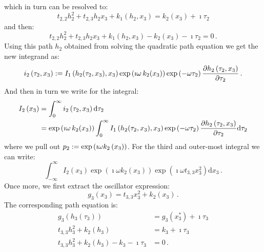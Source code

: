 \documentclass[a4paper,10pt]{article}
\begin{document}
which in turn can be resolved to:
\begin{equation}
  t_{2,2} h_2^2 + t_{2,3} h_2 x_3 + k_1(h_2, x_3) = k_2(x_3) + \imath \tau_2
\end{equation}
and then:
\begin{equation}
  t_{2,2} h_2^2 + t_{2,3} h_2 x_3 + k_1(h_2, x_3) - k_2(x_3) - \imath \tau_2 = 0 \,.
\end{equation}
Using this path $h_2$ obtained from solving the quadratic
path equation we get the new integrand as:
\begin{equation}
  i_2\left(\tau_2, x_3\right) := I_1\left(h_2(\tau_2, x_3), x_3\right)
                                 \exp\left(\imath \omega \,k_2\!\left(x_3\right) \right)
                                 \exp\left(- \omega \tau_2 \right)
                                 \frac{\partial h_2\left(\tau_2, x_3\right)}{\partial \tau_2} \,.
\end{equation}
And then in turn we write for the integral:
\begin{equation*}
\begin{split}
  I_2\left(x_3\right) & = \int_0^{\infty} i_2\left(\tau_2, x_3\right) \mathrm{d}\tau_2 \\
                      & = \exp\left(\imath \omega \,k_2\!\left(x_3\right) \right)
                          \int_0^{\infty} I_1\left(h_2(\tau_2, x_3), x_3\right)
                                          \exp\left(- \omega \tau_2 \right)
                                          \frac{\partial h_2\left(\tau_2, x_3\right)}{\partial \tau_2}
                          \mathrm{d}\tau_2
\end{split}
\end{equation*}
where we pull out $p_2 := \exp\left(\imath \omega k_2\left(x_3\right) \right)$.
For the third and outer-most integral we can write:
\begin{equation}
  \int_{-\infty}^{\infty} I_2\left(x_3\right)
                          \exp\left(\imath \omega k_2\left(x_3\right) \right)
                          \exp\left(\imath \omega t_{3,3} x_3^2\right)
  \mathrm{d}x_3 \,.
\end{equation}
Once more, we first extract the oscillator expression:
\begin{equation}
  g_3\left(x_3\right) = t_{3,3} x_3^2 + k_2(x_3)\,.
\end{equation}
The corresponding path equation is:
\begin{equation}
\begin{split}
  g_3\left(h_3\left(\tau_3\right)\right) & = g_3(x_3^{*}) + \imath \tau_3 \\
  t_{3,3} h_3^2 + k_2(h_3) & = k_3 + \imath \tau_3 \\
  t_{3,3} h_3^2 + k_2(h_3) - k_3 - \imath \tau_3 & = 0 \,.
\end{split}
\end{equation}
\end{document}
